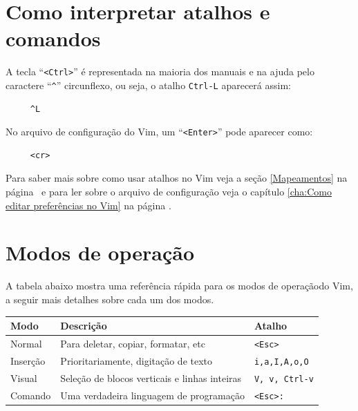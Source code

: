 \section{Como interpretar atalhos e comandos}\label{Como interpretar atalhos e comandos}
%
A tecla ``\verb|<Ctrl>|'' é representada na maioria dos manuais e na ajuda
pelo caractere ``\verb|^|'' circunflexo, ou seja, o atalho \verb|Ctrl-L| aparecerá assim:
\begin{verbatim}
     ^L
\end{verbatim} %

No arquivo de configuração do Vim, um ``\verb|<Enter>|'' pode aparecer como:
\begin{verbatim}
     <cr>
\end{verbatim}

Para saber mais sobre como usar atalhos no Vim
veja a seção \ref{Mapeamentos} na página~\pageref{Mapeamentos} e para ler sobre
o arquivo de configuração veja o capítulo \ref{cha:Como editar preferências no
Vim} na página \pageref{cha:Como editar preferências no Vim}.

\section{Modos de operação}\label{Modos de operação}

A tabela abaixo mostra uma referência rápida para os modos de operaçãodo Vim,
a seguir mais detalhes sobre cada um dos modos. 

\begin{tabular}{|l|l|l|}
\hline
\textbf{Modo} & \textbf{Descrição} & \textbf{Atalho} \tabularnewline
\hline \hline
Normal\index{modo normal} & Para deletar, copiar, formatar, etc & 
                            {\tt <Esc>}\tabularnewline \hline
Inserção\index{modo de inserção} & Prioritariamente, digitação de texto &
                            {}{\tt i,a,I,A,o,O}\tabularnewline \hline
Visual\index{modo visual} & Seleção de blocos verticais e linhas inteiras &
                            {}{\tt V, v, Ctrl-v} \tabularnewline \hline
Comando\index{modo de comando} & Uma verdadeira linguagem de programação &
                            {}{\tt <Esc>:}\tabularnewline \hline
\end{tabular}

